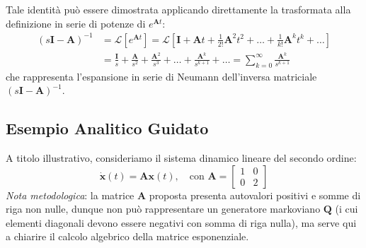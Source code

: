 \documentclass[11pt, a4paper]{article}
\begin{document}
Tale identità può essere dimostrata applicando direttamente la trasformata alla definizione in serie di potenze di $e^{\bm{A}t}$:
\begin{align*}
    (s\bm{I} - \bm{A})^{-1} &= \mathcal{L}\left[ e^{\bm{A}t} \right] = \mathcal{L}\left[ \bm{I} + \bm{A}t + \frac{1}{2!}\bm{A}^2 t^2 + \dots + \frac{1}{k!}\bm{A}^k t^k + \dots \right] \\
    &= \frac{\bm{I}}{s} + \frac{\bm{A}}{s^2} + \frac{\bm{A}^2}{s^3} + \dots + \frac{\bm{A}^k}{s^{k+1}} + \dots = \sum_{k=0}^{\infty} \frac{\bm{A}^k}{s^{k+1}}
\end{align*}
che rappresenta l'espansione in serie di Neumann dell'inversa matriciale $(s\bm{I} - \bm{A})^{-1}$.

\subsection{Esempio Analitico Guidato}

A titolo illustrativo, consideriamo il sistema dinamico lineare del secondo ordine:
\[
    \dot{\bm{x}}(t) = \bm{A} \bm{x}(t), \quad \text{con } \bm{A} = \begin{bmatrix} 1 & 0 \\ 0 & 2 \end{bmatrix}
\]
\emph{Nota metodologica}: la matrice $\bm{A}$ proposta presenta autovalori positivi e somme di riga non nulle, dunque non può rappresentare un generatore markoviano $\bm{Q}$ (i cui elementi diagonali devono essere negativi con somma di riga nulla), ma serve qui a chiarire il calcolo algebrico della matrice esponenziale.
\end{document}
